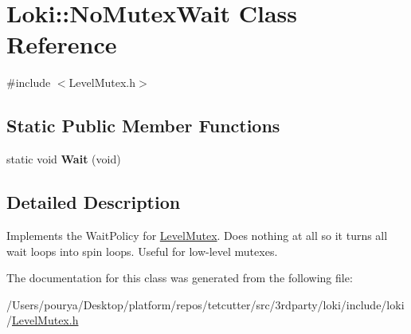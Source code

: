 \hypertarget{classLoki_1_1NoMutexWait}{}\section{Loki\+:\+:No\+Mutex\+Wait Class Reference}
\label{classLoki_1_1NoMutexWait}


{\ttfamily \#include $<$Level\+Mutex.\+h$>$}

\subsection*{Static Public Member Functions}
\begin{DoxyCompactItemize}
\item 
\hypertarget{classLoki_1_1NoMutexWait_a52a99782998a06c95421e1502196e3db}{}static void {\bfseries Wait} (void)\label{classLoki_1_1NoMutexWait_a52a99782998a06c95421e1502196e3db}

\end{DoxyCompactItemize}


\subsection{Detailed Description}
Implements the Wait\+Policy for \hyperlink{classLoki_1_1LevelMutex}{Level\+Mutex}. Does nothing at all so it turns all wait loops into spin loops. Useful for low-\/level mutexes. 

The documentation for this class was generated from the following file\+:\begin{DoxyCompactItemize}
\item 
/\+Users/pourya/\+Desktop/platform/repos/tetcutter/src/3rdparty/loki/include/loki/\hyperlink{LevelMutex_8h}{Level\+Mutex.\+h}\end{DoxyCompactItemize}
